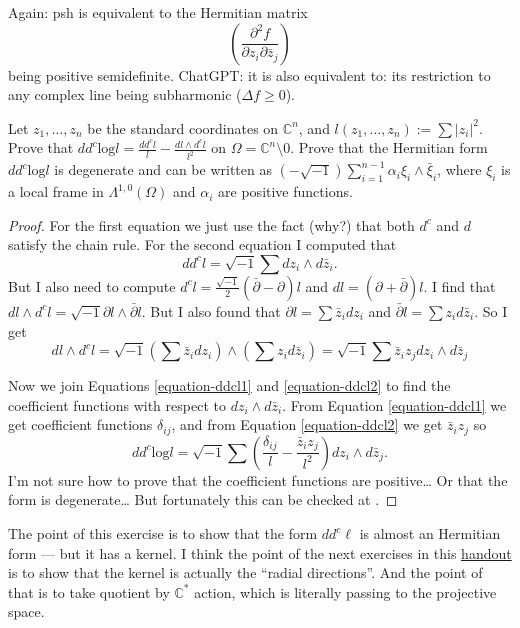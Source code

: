 \noindent
Again: psh is equivalent to the Hermitian matrix
$$
\left(\frac{\partial^2 f}{\partial z_i\partial \bar{z}_j}\right) 
$$
being positive semidefinite.
ChatGPT: it is also equivalent to: its restriction to
any complex line being subharmonic ($\Delta f\geq 0$).

\begin{exercise}
\label{exercise-logl}
Let $z_1,…,z_n$ be the standard coordinates on $\mathbb{C}^n$,
and $l(z_1,…,z_n):=\sum|z_i|^2$.
Prove that $dd^c\text{log}l=\frac{dd^cl}{l}-\frac{dl \wedge d^cl}{l^2}$
on $\Omega=\mathbb{C}^n\setminus 0$.
Prove that the Hermitian form $dd^c \text{log} l$
is degenerate and can be written as
$(-\sqrt{-1})\sum_{i=1}^{n-1} \alpha_i\xi_i\wedge \bar{\xi}_i$,
where $\xi_i$ is a local frame in $\Lambda^{1,0}(\Omega)$
and $\alpha_i$ are positive functions.
\end{exercise}

\begin{proof}
For the first equation we just use the fact
(why?) that both $d^c$ and $d$ satisfy the chain rule.
For the second equation I computed that 
\begin{equation}
\label{equation-ddcl1}
dd^cl=\sqrt{-1}\sum dz_i\wedge d\bar{z}_i.
\end{equation}
But I also need to compute $d^cl=\frac{\sqrt{-1}}{2}(\bar\partial-\partial)l$
and $dl=(\partial+\bar\partial)l$.
I find that $dl \wedge d^cl=\sqrt{-1}\partial l \wedge \bar\partial l$.
But I also found that
$\partial l=\sum \bar{z}_idz_i$ and 
$\bar\partial l=\sum z_i d\bar{z}_i$.
So I get
\begin{equation}
\label{equation-ddcl2}
dl\wedge d^cl=\sqrt{-1}
\left(\sum \bar{z}_i dz_i\right) 
\wedge
\left(\sum z_i d \bar{z}_i\right)
=\sqrt{-1}\sum\bar{z}_iz_jdz_i\wedge d\bar{z}_j
\end{equation}

\noindent
Now we join Equations \ref{equation-ddcl1} and \ref{equation-ddcl2}
to find the coefficient functions with respect to $dz_i \wedge d\bar{z}_i$.
From Equation \ref{equation-ddcl1} we get coefficient functions $\delta_{ij}$,
and from Equation \ref{equation-ddcl2} we get $\bar{z}_iz_j$ so
$$
dd^c\text{log}l=\sqrt{-1}\sum \left(\frac{\delta_{ij}}{l}
-\frac{\bar{z}_iz_j}{l^2}\right)
dz_i \wedge d\bar{z}_j.
$$
I'm not sure how to prove that  the coefficient functions
are positive… Or that the form is degenerate…
But fortunately this can be checked at
\cite[p. 118]{huc}.
\end{proof}

\noindent
The point of this exercise is to show that the form
$dd^c\ell$ is almost an Hermitian form ---
but it has a kernel.
I think the point of the next exercises in this
\href{http://verbit.ru/IMPA/Surfaces-2025/assign-surfaces-2025-04.pdf}{
handout}
is to show that the kernel is actually
the ``radial directions''.
And the point of that is to take quotient
by $\mathbb{C}^*$ action, which is literally
passing to the projective space.

